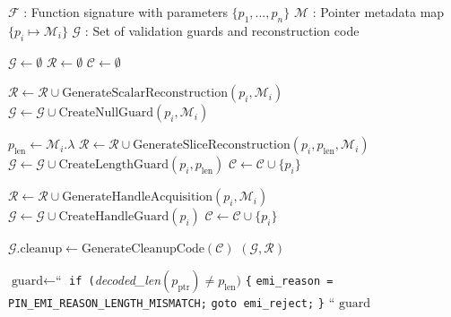 \begin{algorithm}[H]
\caption{EMI (Equivalence Modulo Input) Guard Generation}
\label{alg:emi_guard_generation}
\begin{algorithmic}[1]
\REQUIRE $\mathcal{F}$ : Function signature with parameters $\{p_1, ..., p_n\}$
\REQUIRE $\mathcal{M}$ : Pointer metadata map $\{p_i \mapsto \mathcal{M}_i\}$
\ENSURE $\mathcal{G}$ : Set of validation guards and reconstruction code

    \STATE $\mathcal{G} \leftarrow \emptyset$ 
    \STATE $\mathcal{R} \leftarrow \emptyset$ 
    \STATE $\mathcal{C} \leftarrow \emptyset$ 

            \STATE $\mathcal{R} \leftarrow \mathcal{R} \cup \text{GenerateScalarReconstruction}(p_i, \mathcal{M}_i)$
            \STATE $\mathcal{G} \leftarrow \mathcal{G} \cup \text{CreateNullGuard}(p_i, \mathcal{M}_i)$

            \STATE $p_{\text{len}} \leftarrow \mathcal{M}_i.\lambda$ 
            \STATE $\mathcal{R} \leftarrow \mathcal{R} \cup \text{GenerateSliceReconstruction}(p_i, p_{\text{len}}, \mathcal{M}_i)$
            \STATE $\mathcal{G} \leftarrow \mathcal{G} \cup \text{CreateLengthGuard}(p_i, p_{\text{len}})$
            \STATE $\mathcal{C} \leftarrow \mathcal{C} \cup \{p_i\}$ 

            \STATE $\mathcal{R} \leftarrow \mathcal{R} \cup \text{GenerateHandleAcquisition}(p_i, \mathcal{M}_i)$
            \STATE $\mathcal{G} \leftarrow \mathcal{G} \cup \text{CreateHandleGuard}(p_i)$
            \STATE $\mathcal{C} \leftarrow \mathcal{C} \cup \{p_i\}$ 
        \ENDIF
    \ENDFOR

    \STATE $\mathcal{G}.\text{cleanup} \leftarrow \text{GenerateCleanupCode}(\mathcal{C})$
    \RETURN $(\mathcal{G}, \mathcal{R})$
\ENDPROCEDURE

\vspace{0.3cm}

    \STATE $\text{guard} \leftarrow \text{``}$
    \STATE \quad \texttt{if (}\emph{decoded\_len}$(p_{\text{ptr}}) \neq p_{\text{len}})$ \texttt{\{}
    \STATE \quad \quad \texttt{emi\_reason = PIN\_EMI\_REASON\_LENGTH\_MISMATCH;}
    \STATE \quad \quad \texttt{goto emi\_reject;}
    \STATE \quad \texttt{\}}
    \STATE $\text{``}$
    \RETURN $\text{guard}$
\ENDPROCEDURE


\end{algorithmic}
\end{algorithm}
